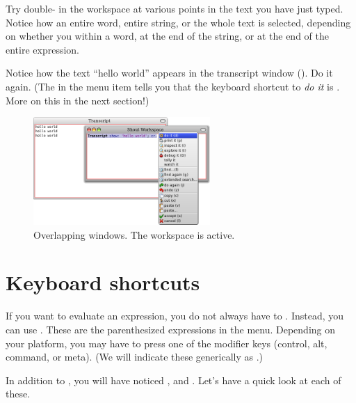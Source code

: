 \documentclass[a4paper,10pt,twoside]{book}
\begin{document}
Try double- in the workspace at various points in the text you have just typed.
Notice how an entire word, entire string, or the whole text is selected, depending on whether you \click within a word, at the end of the string, or at the end of the entire expression.

Notice how the text ``hello world'' appears in the transcript window
().
Do it again.
(The  in the menu item  tells you that the keyboard shortcut to \emph{do it} is . More on this in the next section!)

\begin{figure}[htb]
\centerline {\includegraphics[width=0.6\textwidth]{HelloWorld}}
\caption{Overlapping windows. The workspace is active.\label{fig:helloworld}}
\end{figure}

\section{Keyboard shortcuts}

If you want  to evaluate an expression, you do not always have to \actclick. Instead, you can use . These are the parenthesized expressions in the menu.  Depending on your platform, you may have to press one of the modifier keys (control, alt, command, or meta).
(We will indicate these generically as .)


In addition to , you will have noticed ,  and . Let's have a quick look at each of these.

\end{document}
